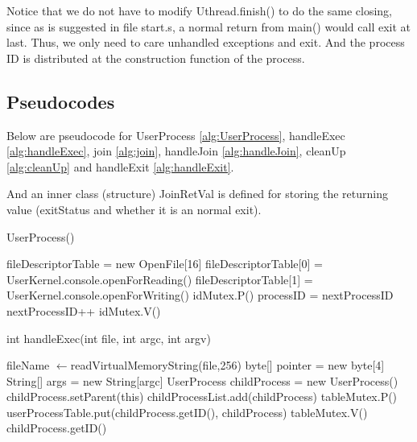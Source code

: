 \documentclass{article}
\renewcommand{\gets}{%
  \ensuremath{\leftarrow}}
\begin{document}
\begin{spacing}{1.1}
Notice that we do not have to modify \textsf{Uthread.finish()} to do the same closing, since as is suggested in file \textsf{start.s}, a normal return from \textsf{main()} would call \textsf{exit} at last. Thus, we only need to care unhandled exceptions and \textsf{exit}. And the process ID is distributed at the construction function of the process.
\subsection{Pseudocodes}
Below are pseudocode for \textsf{UserProcess} \ref{alg:UserProcess}, \textsf{handleExec} \ref{alg:handleExec}, \textsf{join} \ref{alg:join}, \textsf{handleJoin} \ref{alg:handleJoin}, \textsf{cleanUp} \ref{alg:cleanUp} and \textsf{handleExit} \ref{alg:handleExit}.

And an inner class (structure) \textsf{JoinRetVal} is defined for storing the returning value (exitStatus and whether it is an normal exit).
\begin{algorithm}
  \label{alg:UserProcess}
  \caption{\textsf{UserProcess}()}
  fileDescriptorTable = new OpenFile[16]\;
  fileDescriptorTable[0] = UserKernel.console.openForReading()\;
  fileDescriptorTable[1] = UserKernel.console.openForWriting()\;
  \colorbox{myyellow}{idMutex.P()}\;
  processID = nextProcessID\;
  nextProcessID++\;
  \colorbox{myyellow}{idMutex.V()}\;
\end{algorithm}

\begin{algorithm}[H]
  \label{alg:handleExec}
  \caption{int \textsf{handleExec}(int file, int argc, int argv)}
  fileName\gets\textsf{readVirtualMemoryString}(file,256)\;
   {
    \;
  }
  byte[] pointer = new byte[4]\;
  String[] args = new String[argc]\;
  UserProcess childProcess = new UserProcess()\;
   {
    \;
  }
  childProcess.setParent(this)\;
  childProcessList.add(childProcess)\;
  \colorbox{myyellow}{tableMutex.P()}\;
  userProcessTable.put(childProcess.getID(), childProcess)\;
  \colorbox{myyellow}{tableMutex.V()}\;
  \Return childProcess.getID()\;
\end{algorithm}


\end{spacing}
\end{document}
